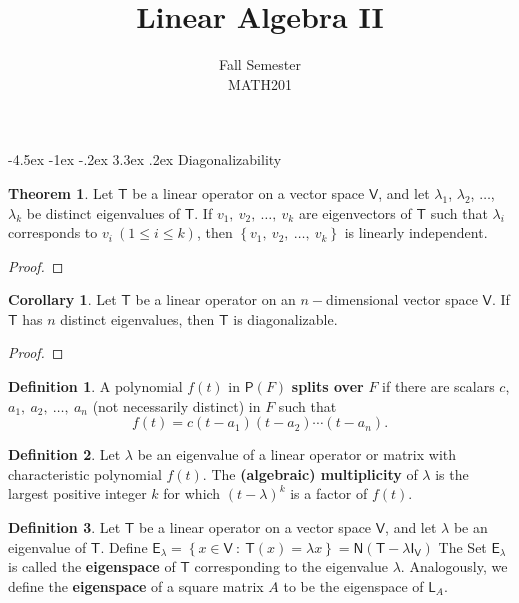 \documentclass[12pt]{book}
\title{Linear Algebra II}
\author{Fall Semester\\MATH201}
\date{}
\makeatletter
\theoremstyle{definition}
\newtheorem{theorem}{Theorem}[chapter]
\newtheorem*{corollary*}{Corollary}
\newtheorem*{definition}{Definition}
\renewcommand\chapter{\@startsection {chapter}{0}{\z@}%
	{-4.5ex \@plus -1ex \@minus -.2ex}%
	{3.3ex \@plus.2ex}%
	{\normalfont\LARGE\bfseries}}
\makeatother
\begin{document}
	\setcounter{chapter}{1}
	\listoftheorems[title = Contents]
	\newpage
	\chapter{Diagonalizability}
	\setcounter{theorem}{4}
	\begin{theorem}
		Let $\mathsf{T}$ be a linear operator on a vector space $\mathsf{V}$, and let $\lambda_{1}$, $\lambda_{2}$, $\ldots$, $\lambda_k$ be distinct eigenvalues of $\mathsf{T}$. If $v_1,~v_2,~\ldots,~v_k$ are eigenvectors of $\mathsf{T}$ such that $\lambda_i$ corresponds to $v_i\ (1\leq i\leq k)$, then $\left\{v_1,~v_2,~\ldots,~v_k\right\}$ is linearly independent.
	\end{theorem}
	\begin{proof}
	\end{proof}
	\vfill
	\begin{corollary*}
		Let $\mathsf{T}$ be a linear operator on an $n-$dimensional vector space $\mathsf{V}$. If $\mathsf{T}$ has $n$ distinct eigenvalues, then $\mathsf{T}$ is diagonalizable.
	\end{corollary*}
	\begin{proof}
	\end{proof}
	\bigskip\bigskip\bigskip\bigskip\bigskip\bigskip\bigskip\bigskip
	\newpage
	\begin{definition}
		A polynomial $f(t)$ in $\mathsf{P}(F)$ \textbf{splits over} $F$ if there are scalars $c$, $a_1,~a_2,~\ldots,~a_n$ (not necessarily distinct) in $F$ such that
		$$f(t)=c(t-a_1)(t-a_2)\cdots(t-a_n).$$
	\end{definition}
	\vspace*{\fill}
	\begin{definition}
		Let $\lambda$ be an eigenvalue of a linear operator or matrix with characteristic polynomial $f(t)$. The \textbf{(algebraic) multiplicity} of $\lambda$ is the largest positive integer $k$ for which $(t-\lambda)^k$ is a factor of $f(t)$.
	\end{definition}
	\vspace*{\fill}
	\begin{definition}
		Let $\mathsf{T}$ be a linear operator on a vector space $\mathsf{V}$, and let $\lambda$ be an eigenvalue of $\mathsf{T}$. Define $\mathsf{E}_\lambda=\left\{x\in \mathsf{V}\ :\ \mathsf{T}(x)=\lambda x\right\}=\mathsf{N}(\mathsf{T}-\lambda\mathsf{I}_\mathsf{V})$ The Set $\mathsf{E}_\lambda$ is called the \textbf{eigenspace} of $\mathsf{T}$ corresponding to the eigenvalue $\lambda$. Analogously, we define the \textbf{eigenspace} of a square matrix $A$ to be the eigenspace of $\mathsf{L}_A$.
	\end{definition}
\end{document}
